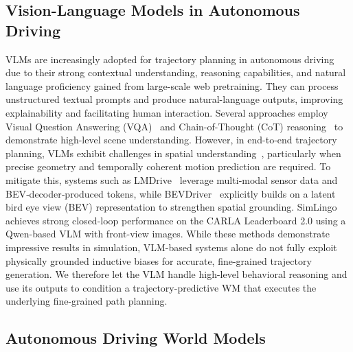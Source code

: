 \documentclass[letterpaper, 10 pt, conference]{ieeeconf}
\begin{document}
\subsection{Vision-Language Models in Autonomous Driving}
VLMs are increasingly adopted for trajectory planning in autonomous driving due to their strong contextual understanding, reasoning capabilities, and natural language proficiency gained from large-scale web pretraining. They can process unstructured textual prompts and produce natural-language outputs, improving explainability and facilitating human interaction. Several approaches employ Visual Question Answering (VQA)~\cite{sima2024drivelm, omnidrive2024, marcuLingoQAVisualQuestion2024} and Chain-of-Thought (CoT) reasoning~\cite{hwang2025emma, sima2024drivelm} to demonstrate high-level scene understanding. However, in end-to-end trajectory planning, VLMs exhibit challenges in spatial understanding~\cite{omnidrive2024, hwang2025emma}, particularly when precise geometry and temporally coherent motion prediction are required. To mitigate this, systems such as LMDrive~\cite{shao_lmdrive_2024} leverage multi‑modal sensor data and BEV‑decoder‑produced tokens, while BEVDriver~\cite{winter2025bevdriver} explicitly builds on a latent bird eye view (BEV) representation to strengthen spatial grounding. SimLingo~\cite{renz2025simlingo} achieves strong closed-loop performance on the CARLA Leaderboard 2.0 using a Qwen-based VLM with front-view images.
While these methods demonstrate impressive results in simulation, VLM-based systems alone do not fully exploit physically grounded inductive biases for accurate, fine-grained trajectory generation. We therefore let the VLM handle high-level behavioral reasoning and use its outputs to condition a trajectory-predictive WM that executes the underlying fine-grained path planning.

\subsection{Autonomous Driving World Models}
\end{document}
